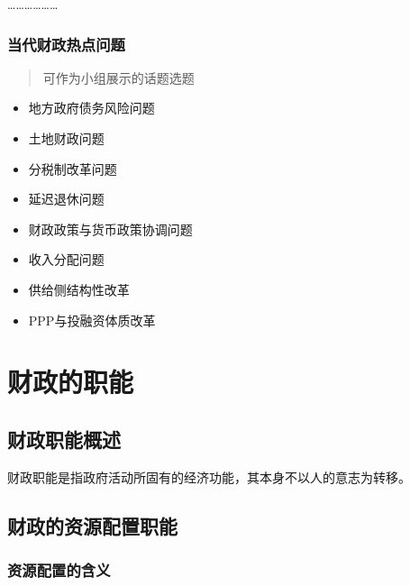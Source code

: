 \documentclass[
]{book}
\providecommand{\tightlist}{%
  \setlength{\itemsep}{0pt}\setlength{\parskip}{0pt}}
\theoremstyle{definition}
\theoremstyle{definition}
\theoremstyle{definition}
\theoremstyle{definition}
\theoremstyle{remark}
\begin{document}
\ldots\ldots\ldots\ldots\ldots\ldots{}

\hypertarget{ux5f53ux4ee3ux8d22ux653fux70edux70b9ux95eeux9898}{%
\subsection{当代财政热点问题}\label{ux5f53ux4ee3ux8d22ux653fux70edux70b9ux95eeux9898}}

\begin{quote}
可作为小组展示的话题选题
\end{quote}

\begin{itemize}
\tightlist
\item
  地方政府债务风险问题
\item
  土地财政问题
\item
  分税制改革问题
\item
  延迟退休问题
\item
  财政政策与货币政策协调问题
\item
  收入分配问题
\item
  供给侧结构性改革
\item
  PPP与投融资体质改革
\end{itemize}

\hypertarget{ux804cux80fd}{%
\chapter{财政的职能}\label{ux804cux80fd}}

\hypertarget{ux8d22ux653fux804cux80fdux6982ux8ff0}{%
\section{财政职能概述}\label{ux8d22ux653fux804cux80fdux6982ux8ff0}}

财政职能是指政府活动所固有的经济功能，其本身不以人的意志为转移。

\hypertarget{ux8d22ux653fux7684ux8d44ux6e90ux914dux7f6eux804cux80fd}{%
\section{财政的资源配置职能}\label{ux8d22ux653fux7684ux8d44ux6e90ux914dux7f6eux804cux80fd}}

\hypertarget{ux8d44ux6e90ux914dux7f6eux7684ux542bux4e49}{%
\subsection{资源配置的含义}\label{ux8d44ux6e90ux914dux7f6eux7684ux542bux4e49}}
\end{document}
